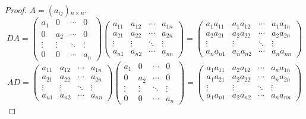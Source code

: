 \documentclass[class=nhvh-linear-algebra,crop=false]{standalone}
\begin{document}
\begin{proof}
    $A = (a_{ij}){}_{n\times n}$.
    \[
        DA =
        \begin{pmatrix}
            a_{1}  & 0      & \cdots & 0      \\
            0      & a_{2}  & \cdots & 0      \\
            \vdots & \vdots & \ddots & \vdots \\
            0      & 0      & \cdots & a_{n}
        \end{pmatrix}
        \begin{pmatrix}
            a_{11} & a_{12} & \cdots & a_{1n} \\
            a_{21} & a_{22} & \cdots & a_{2n} \\
            \vdots & \vdots & \ddots & \vdots \\
            a_{n1} & a_{n2} & \cdots & a_{nn}
        \end{pmatrix}
        =
        \begin{pmatrix}
            a_{1}a_{11} & a_{1}a_{12} & \cdots & a_{1}a_{1n} \\
            a_{2}a_{21} & a_{2}a_{22} & \cdots & a_{2}a_{2n} \\
            \vdots      & \vdots      & \ddots & \vdots      \\
            a_{n}a_{n1} & a_{n}a_{n2} & \cdots & a_{n}a_{nn}
        \end{pmatrix}
    \]
    \[
        AD =
        \begin{pmatrix}
            a_{11} & a_{12} & \cdots & a_{1n} \\
            a_{21} & a_{22} & \cdots & a_{2n} \\
            \vdots & \vdots & \ddots & \vdots \\
            a_{n1} & a_{n2} & \cdots & a_{nn}
        \end{pmatrix}
        \begin{pmatrix}
            a_{1}  & 0      & \cdots & 0      \\
            0      & a_{2}  & \cdots & 0      \\
            \vdots & \vdots & \ddots & \vdots \\
            0      & 0      & \cdots & a_{n}
        \end{pmatrix}
        =
        \begin{pmatrix}
            a_{1}a_{11} & a_{2}a_{12} & \cdots & a_{n}a_{1n} \\
            a_{1}a_{21} & a_{2}a_{22} & \cdots & a_{n}a_{2n} \\
            \vdots      & \vdots      & \ddots & \vdots      \\
            a_{1}a_{n1} & a_{2}a_{n2} & \cdots & a_{n}a_{nn}
        \end{pmatrix}
    \]
\end{proof}
\end{document}
